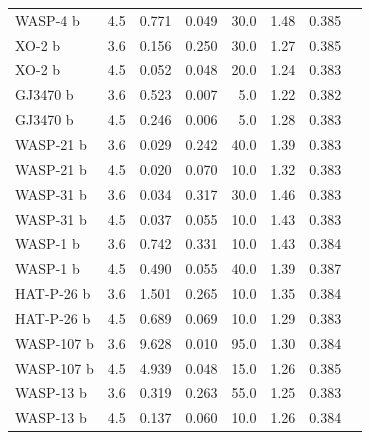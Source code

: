 \begin{subappendices}
{\begin{landscape}
\begin{longtable}[h]{llrrrrrr}
  WASP-4 b    &               4.5 &           0.771 &      0.049 &     30.0 &          1.48 &                0.385 \\
  XO-2 b      &               3.6 &           0.156 &      0.250 &     30.0 &          1.27 &                0.385 \\
  XO-2 b      &               4.5 &           0.052 &      0.048 &     20.0 &          1.24 &                0.383 \\
  GJ3470 b   &               3.6 &           0.523 &      0.007 &      5.0 &          1.22 &                0.382 \\
  GJ3470 b   &               4.5 &           0.246 &      0.006 &      5.0 &          1.28 &                0.383 \\
  WASP-21 b   &               3.6 &           0.029 &      0.242 &     40.0 &          1.39 &                0.383 \\
  WASP-21 b   &               4.5 &           0.020 &      0.070 &     10.0 &          1.32 &                0.383 \\
  WASP-31 b   &               3.6 &           0.034 &      0.317 &     30.0 &          1.46 &                0.383 \\
  WASP-31 b   &               4.5 &           0.037 &      0.055 &     10.0 &          1.43 &                0.383 \\
  WASP-1 b    &               3.6 &           0.742 &      0.331 &     10.0 &          1.43 &                0.384 \\
  WASP-1 b    &               4.5 &           0.490 &      0.055 &     40.0 &          1.39 &                0.387 \\
  HAT-P-26 b   &               3.6 &           1.501 &      0.265 &     10.0 &          1.35 &                0.384 \\
  HAT-P-26 b   &               4.5 &           0.689 &      0.069 &     10.0 &          1.29 &                0.383 \\
  WASP-107 b  &               3.6 &           9.628 &      0.010 &     95.0 &          1.30 &                0.384 \\
  WASP-107 b  &               4.5 &           4.939 &      0.048 &     15.0 &          1.26 &                0.385 \\
  WASP-13 b   &               3.6 &           0.319 &      0.263 &     55.0 &          1.25 &                0.383 \\
  WASP-13 b   &               4.5 &           0.137 &      0.060 &     10.0 &          1.26 &                0.384 \\

\end{longtable}
\end{landscape}}
\end{subappendices}
